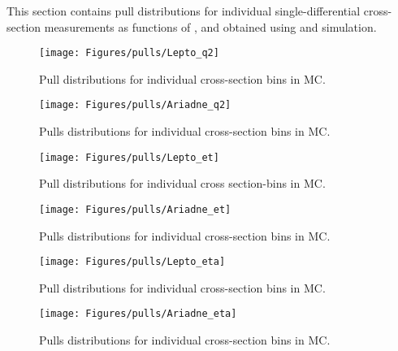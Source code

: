 This section contains pull distributions for individual single-differential cross-section measurements as functions of \qsq, \etjetb and \etajetb obtained using \lepto and \ariadne simulation.
\begin{figure}[p!]
	\centering
		\texttt{[image: Figures/pulls/Lepto\_q2]}
	\caption{Pull distributions for individual \dsdqsq cross-section bins in \lepto MC.}
	\label{fig:q2_pulls_ari}
\end{figure}

\begin{figure}[p!]
	\centering
		\texttt{[image: Figures/pulls/Ariadne\_q2]}
	\caption{Pulls distributions for individual \dsdqsq cross-section bins in \ariadne MC.}
	\label{fig:q2_pulls_ari}
\end{figure}

\begin{figure}[p!]
	\centering
		\texttt{[image: Figures/pulls/Lepto\_et]}
	\caption{Pull distributions for individual \dsdqsq cross section-bins in \lepto MC.}
	\label{fig:et_pulls_lep}
\end{figure}

\begin{figure}[p!]
	\centering
		\texttt{[image: Figures/pulls/Ariadne\_et]}
	\caption{Pulls distributions for individual \dsdetjetb cross-section bins in \ariadne MC.}
	\label{fig:et_pulls_ari}
\end{figure}

\begin{figure}[p!]
	\centering
		\texttt{[image: Figures/pulls/Lepto\_eta]}
	\caption{Pull distributions for individual \dsdetajetb cross-section bins in \lepto MC.}
	\label{fig:eta_pulls_lep}
\end{figure}

\begin{figure}[p!]
	\centering
		\texttt{[image: Figures/pulls/Ariadne\_eta]}
	\caption{Pulls distributions for individual \dsdetajetb cross-section bins in \ariadne MC.}
	\label{fig:eta_pulls_ari}
\end{figure}